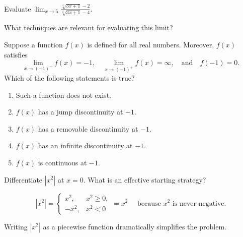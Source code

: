 \documentclass[aspectratio=169, 12pt]{beamer}
\begin{document}
\begin{poll}
  Evaluate \(\displaystyle \lim_{x \to 5} \frac{\sqrt[4]{3x + 1} - 2}{\sqrt[2]{3x + 1} - 4}\).

  What techniques are relevant for evaluating this limit?

\end{poll}

\begin{poll}
  Suppose a function \(f(x)\) is defined for all real numbers. Moreover, \(f(x)\) satisfies
  \[
    \lim_{x \to (-1)^{-}} f(x) = -1,
    \quad
    \lim_{x \to (-1)^{+}} f(x) = \infty,
    \quad\text{and}\quad
    f(-1) = 0.
  \]
  Which of the following statements is true?

  \begin{enumerate}[label=\Alph*.]
    \item Such a function does not exist.
    \item \(f(x)\) has a jump discontinuity at \(-1\).
    \item \(f(x)\) has a removable discontinuity at \(-1\).
    \item \(f(x)\) has an infinite discontinuity at \(-1\).
    \item \(f(x)\) is continuous at \(-1\).
  \end{enumerate}
\end{poll}



\begin{poll}
  Differentiate \(\left|x^{2}\right|\) at \(x = 0\).
  What is an effective starting strategy?

  \pause
  \[
    \left|x^{2}\right| = \begin{cases}
      x^{2}, & x^{2} \ge 0,\\
      -x^{2}, & x^{2} < 0
    \end{cases}
    = x^{2} \quad\text{ because \(x^{2}\) is never negative.}
  \]

   Writing \(|x^{2}|\) as a piecewise function dramatically simplifies the problem.
\end{poll}
\end{document}

